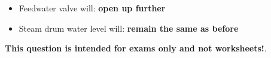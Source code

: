 





\begin{itemize}
\item{} Feedwater valve will: {\bf open up further}
\vskip 5pt
\item{} Steam drum water level will: {\bf remain the same as before}
\end{itemize}







{\bf This question is intended for exams only and not worksheets!}.



